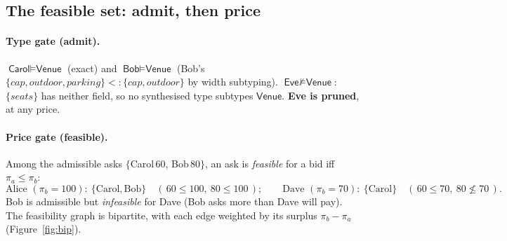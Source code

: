 \documentclass[11pt]{article}
\theoremstyle{definition}
\newcommand{\modelsT}{\models}
\newcommand{\Venue}{\textsf{Venue}}
\newcommand{\subt}{<:}
\begin{document}
\subsection{The feasible set: admit, then price}\label{sec:feasible}

\paragraph{Type gate (admit).}
$\textsf{Carol} \modelsT \Venue$ (exact) and $\textsf{Bob} \modelsT \Venue$ (Bob's
$\{\mathit{cap},\mathit{outdoor},\mathit{parking}\} \subt \{\mathit{cap},\mathit{outdoor}\}$ by width
subtyping). $\textsf{Eve} \not\modelsT \Venue$: $\{\mathit{seats}\}$ has neither field, so no
synthesised type subtypes $\Venue$. \textbf{Eve is pruned}, at any price.

\paragraph{Price gate (feasible).}
Among the admissible asks $\{$Carol$\,60$, Bob$\,80\}$, an ask is \emph{feasible} for a bid iff
$\pi_a \le \pi_b$:
\[
\text{Alice }(\pi_b{=}100):\ \{\text{Carol},\text{Bob}\}\quad(\,60\le100,\ 80\le100\,);
\qquad
\text{Dave }(\pi_b{=}70):\ \{\text{Carol}\}\quad(\,60\le70,\ 80\not\le70\,).
\]
Bob is admissible but \emph{infeasible} for Dave (Bob asks more than Dave will pay). The feasibility
graph is bipartite, with each edge weighted by its surplus $\pi_b-\pi_a$ (Figure~\ref{fig:bip}).
\end{document}
